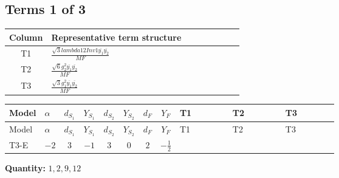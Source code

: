 \documentclass[8pt]{article}
\begin{document}
\begin{landscape}
\subsection*{Terms 1 of 3}
\begin{center}
\begin{tabular}{@{}c >{\raggedright\arraybackslash}p{0.82\linewidth}@{}}
\toprule
Column & Representative term structure \\
\midrule
T1 & \(\displaystyle \frac{\sqrt{3} lambda12Inv1 \overline{y_{1}} \overline{y_{2}}}{MF}\) \\
\midrule
T2 & \(\displaystyle \frac{\sqrt{6} g_{2}^{2} \overline{y_{1}} \overline{y_{2}}}{MF}\) \\
\midrule
T3 & \(\displaystyle \frac{\sqrt{3} g_{1}^{2} \overline{y_{1}} \overline{y_{2}}}{MF}\) \\
\midrule
\bottomrule
\end{tabular}
\end{center}
\smallskip
\tiny
\begin{longtable}{@{}llcccccc >{\raggedright\arraybackslash}p{0.21\linewidth} >{\raggedright\arraybackslash}p{0.21\linewidth} >{\raggedright\arraybackslash}p{0.21\linewidth}@{}}
\toprule
Model & $\alpha$ & $d_{S_1}$ & $Y_{S_1}$ & $d_{S_2}$ & $Y_{S_2}$ & $d_F$ & $Y_F$ & T1 & T2 & T3 \\
\midrule
\endfirsthead
\toprule
Model & $\alpha$ & $d_{S_1}$ & $Y_{S_1}$ & $d_{S_2}$ & $Y_{S_2}$ & $d_F$ & $Y_F$ & T1 & T2 & T3 \\
\midrule
\endhead
T3-E & $-2$ & $3$ & $-1$ & $3$ & $0$ & $2$ & $-\frac{1}{2}$ & \scriptsize\adjustbox{max width=\linewidth}{$\begin{gathered} - \frac{\sqrt{3} lambda12Inv1 \overline{y_{1}} \overline{y_{2}}}{6 MF}\end{gathered}$} & \scriptsize\adjustbox{max width=\linewidth}{$\begin{gathered} \frac{\sqrt{6} g_{2}^{2} \overline{y_{1}} \overline{y_{2}}}{6 MF}\end{gathered}$} & \scriptsize\adjustbox{max width=\linewidth}{$\begin{gathered} \frac{\sqrt{3} g_{1}^{2} \overline{y_{1}} \overline{y_{2}}}{8 MF}\end{gathered}$} \\
\midrule
\bottomrule
\end{longtable}
\clearpage
\noindent\textbf{Quantity: }$\mathrm{1,2,9,12}$\par\smallskip

\end{landscape}
\end{document}
